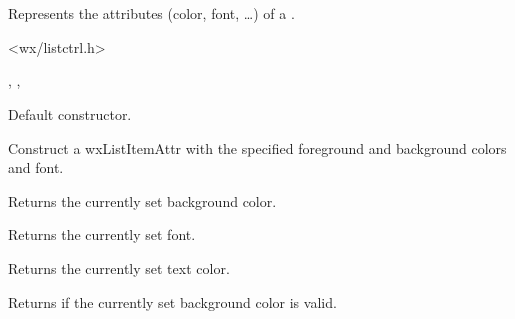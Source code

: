 \section{}\label{wxlistitemattr}

Represents the attributes (color, font, \ldots) of a
 .


<wx/listctrl.h>


, , 


\label{wxlistitemattrctor}


Default constructor.


Construct a wxListItemAttr with the specified foreground and
background colors and font.

\label{wxlistitemattrgetbackgroundcolour}


Returns the currently set background color.


\label{wxlistitemattrgetfont}


Returns the currently set font.


\label{wxlistitemattrgettextcolour}


Returns the currently set text color.


\label{wxlistitemattrhasbackgroundcolour}


Returns \true if the currently set background color is valid.


\label{wxlistitemattrhasfont}

